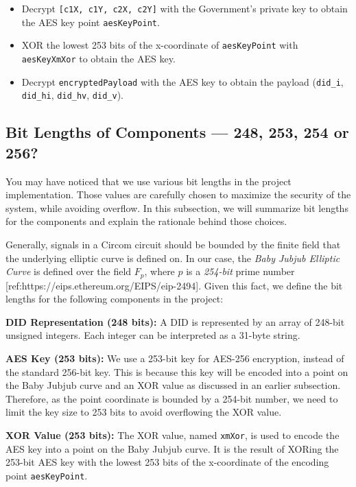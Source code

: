 \documentclass[
]{report}
\providecommand{\tightlist}{%
  \setlength{\itemsep}{0pt}\setlength{\parskip}{0pt}}
\begin{document}
\begin{itemize}
\tightlist
\item
  Decrypt \texttt{{[}c1X,\ c1Y,\ c2X,\ c2Y{]}} with the Government's
  private key to obtain the AES key point \texttt{aesKeyPoint}.
\item
  XOR the lowest 253 bits of the x-coordinate of \texttt{aesKeyPoint}
  with \texttt{aesKeyXmXor} to obtain the AES key.
\item
  Decrypt \texttt{encryptedPayload} with the AES key to obtain the
  payload (\texttt{did\_i}, \texttt{did\_hi}, \texttt{did\_hv},
  \texttt{did\_v}).
\end{itemize}

\subsection{Bit Lengths of Components --- 248, 253, 254 or 256?}

You may have noticed that we use various bit lengths in the project
implementation. Those values are carefully chosen to maximize the
security of the system, while avoiding overflow. In this subsection, we
will summarize bit lengths for the components and explain the rationale
behind those choices.

Generally, signals in a Circom circuit should be bounded by the finite
field that the underlying elliptic curve is defined on. In our case, the
\emph{Baby Jubjub Elliptic Curve} is defined over the field \(F_p\),
where \(p\) is a \emph{254-bit} prime number
{[}ref:https://eips.ethereum.org/EIPS/eip-2494{]}. Given
this fact, we define the bit lengths for the following components in the
project:

\textbf{DID Representation (248 bits):} A DID is represented by
an array of 248-bit unsigned integers. Each integer can be interpreted
as a 31-byte string.

\textbf{AES Key (253 bits):} We use a 253-bit key for AES-256
encryption, instead of the standard 256-bit key. This is because this
key will be encoded into a point on the Baby Jubjub curve and an XOR
value as discussed in an earlier subsection. Therefore, as the point
coordinate is bounded by a 254-bit number, we need to limit the key size
to 253 bits to avoid overflowing the XOR value.

\textbf{XOR Value (253 bits):} The XOR value, named
\texttt{xmXor}, is used to encode the AES key into a point on the Baby
Jubjub curve. It is the result of XORing the 253-bit AES key with the
lowest 253 bits of the x-coordinate of the encoding point
\texttt{aesKeyPoint}.
\end{document}
